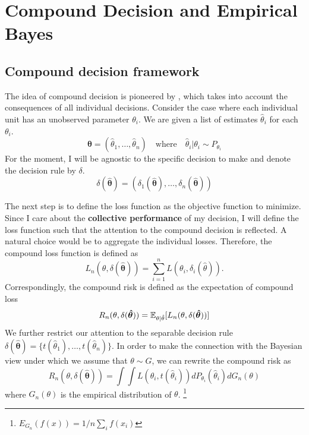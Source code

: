 \documentclass[12pt]{article}
\begin{document}
\begin{table}
    
    \label{tab:reg_wg_fd_iv}
\end{table}

\section{Compound Decision and Empirical Bayes}

\subsection{Compound decision framework}

The idea of compound decision is pioneered by \citet{robbins1956empirical},
which takes into account the consequences of all individual decisions. Consider
the case where each individual unit has an unobserved parameter $\theta_i$. We
are given a list of estimates $\hat{\theta}_i$ for each $\theta_i$.
\begin{equation*}
    \boldsymbol{\hat{\theta}}  =  (\hat{\theta}_1,\ldots, \hat{\theta}_n)\quad
    \text{where} \quad        \hat{\theta}_i | \theta_i \sim P_{\theta_i}
\end{equation*}
For the moment, I will be agnostic to the specific decision to make and denote the decision rule by $\delta$.
\begin{equation*}
    \delta(\boldsymbol{\hat{\theta}}) = (\delta_1(\boldsymbol{\hat{\theta}}), \ldots, \delta_n(\boldsymbol{\hat{\theta}}))
\end{equation*}

The next step is to define the loss function as the objective function to
minimize. Since I care about the \textbf{collective performance} of my
decision, I will define the loss function such that the attention to the
compound decision is reflected. A natural choice would be to aggregate the
individual losses. Therefore, the compound loss function is defined as
\begin{equation*}
    L_n(\theta, \delta(\boldsymbol{\hat{\theta}})) = \sum_{i=1}^n L(\theta_i, \delta_i(\hat{\theta})).
\end{equation*}
Correspondingly, the compound risk is defined as the expectation of compound loss
\begin{equation*}
    R_n(\theta, \delta(\boldsymbol{\hat{\theta}})) = \mathbb{E}_{\theta|\hat{\theta}}[L_n(\theta, \delta(\boldsymbol{\hat{\theta}}))]
\end{equation*}
We further restrict our attention to the separable decision rule $\delta(\boldsymbol{\hat{\theta}})=\{t(\hat{\theta}_1), \ldots, t(\hat{\theta}_n)\}$. In order to make the connection with the Bayesian view under which we assume
that $\theta\sim G$, we can rewrite the compound risk as
\begin{equation*}
    R_n(\theta, \delta(\boldsymbol{\hat{\theta}})) = \int \int L(\theta_i, t(\hat{\theta}_i))dP_{\theta_i}(\hat{\theta}_i)dG_n(\theta)
\end{equation*}
where $G_n(\theta)$ is the empirical distribution of $\theta$. \footnote{$E_{G_n}(f(x)) = 1/n \sum_i f(x_i)$}
\end{document}
